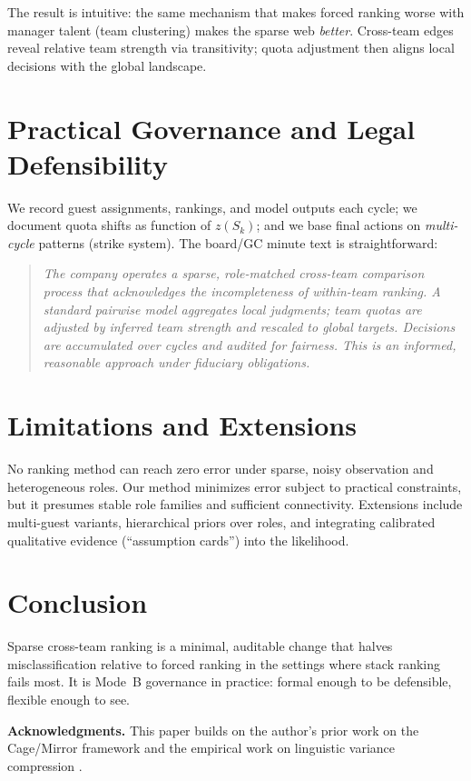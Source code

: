 \documentclass[11pt]{article}
\begin{document}
The result is intuitive: the same mechanism that makes forced ranking worse with manager talent (team clustering) makes the sparse web \emph{better}. Cross-team edges reveal relative team strength via transitivity; quota adjustment then aligns local decisions with the global landscape.

\section{Practical Governance and Legal Defensibility}
We record guest assignments, rankings, and model outputs each cycle; we document quota shifts as function of $z(S_k)$; and we base final actions on \emph{multi-cycle} patterns (strike system). The board/GC minute text is straightforward:

\begin{quote}\itshape
The company operates a sparse, role-matched cross-team comparison process that acknowledges the incompleteness of within-team ranking. A standard pairwise model aggregates local judgments; team quotas are adjusted by inferred team strength and rescaled to global targets. Decisions are accumulated over cycles and audited for fairness. This is an informed, reasonable approach under fiduciary obligations.
\end{quote}

\section{Limitations and Extensions}
No ranking method can reach zero error under sparse, noisy observation and heterogeneous roles. Our method minimizes error subject to practical constraints, but it presumes stable role families and sufficient connectivity. Extensions include multi-guest variants, hierarchical priors over roles, and integrating calibrated qualitative evidence (``assumption cards'') into the likelihood.

\section{Conclusion}
Sparse cross-team ranking is a minimal, auditable change that halves misclassification relative to forced ranking in the settings where stack ranking fails most. It is Mode~B governance in practice: formal enough to be defensible, flexible enough to see.
\vspace{6pt}

\noindent\textbf{Acknowledgments.} This paper builds on the author's prior work on the Cage/Mirror framework \citep{jeremy2025-cage,jeremy2025-mirror,jeremy2025-rank} and the empirical work on linguistic variance compression \citep{jeremy2025-analysis}.



\end{document}
